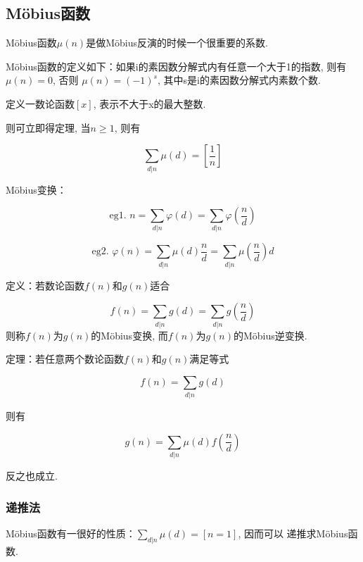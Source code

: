     \subsection{M\"{o}bius函数}\small
M\"{o}bius函数$\mu (n)$是做M\"{o}bius反演的时候一个很重要的系数.

M\"{o}bius函数的定义如下：如果i的素因数分解式内有任意一个大于1的指数, 则有
$\mu (n) = 0$, 否则
$\mu (n) = (-1)^s$, 其中s是i的素因数分解式内素数个数.

定义一数论函数$[x]$, 表示不大于x的最大整数.

则可立即得定理, 当$n \geq 1$, 则有

\begin{equation}
\sum\limits_{d|n} \mu (d) = [\frac{1}{n}]
\end{equation}

M\"{o}bius变换：

\begin{equation}
\text{eg1.\ }n = \sum\limits_{d|n} \varphi (d) = \sum\limits_{d|n} \varphi (\frac{n}{d})
\end{equation}

\begin{equation}
\text{eg2.\ }\varphi (n) = \sum\limits_{d|n} \mu (d) \frac{n}{d} = \sum\limits_{d|n} \mu (\frac{n}{d}) d
\end{equation}

定义：若数论函数$f(n)$和$g(n)$适合

\begin{equation}
f(n) = \sum\limits_{d|n} g(d) = \sum\limits_{d|n} g(\frac{n}{d})
\end{equation}
则称$f(n)$为$g(n)$的M\"{o}bius变换, 而$f(n)$为$g(n)$的M\"{o}bius逆变换.


定理：若任意两个数论函数$f(n)$和$g(n)$满足等式

\begin{equation}
f(n) = \sum\limits_{d|n} g(d)
\end{equation}

则有

\begin{equation}
g(n) = \sum\limits_{d|n} \mu (d) f(\frac{n}{d})
\end{equation}

反之也成立.


        \subsubsection{递推法}\small
M\"{o}bius函数有一很好的性质：$\sum\limits_{d|n} \mu (d) = [n = 1]$, 因而可以
递推求M\"{o}bius函数.


